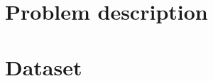 \documentclass[
10pt, %
a4paper, %
oneside, %
headinclude,footinclude, %
BCOR5mm, %
]{scrartcl}
\begin{document}





\section{Problem description}
 


\section{Dataset}
\end{document}
